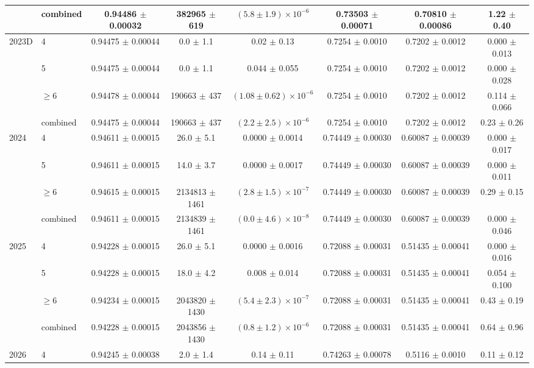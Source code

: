 \begin{table}
\begin{tiny}
\begin{tabular}{llcccccc}
 & combined & 0.94486 $\pm$ 0.00032 & 382965 $\pm$ 619 & $(5.8 \pm 1.9) \times 10^{-6}$ & 0.73503 $\pm$ 0.00071 & 0.70810 $\pm$ 0.00086 & 1.22 $\pm$ 0.40 \\
\hline
\multirow{4}{*}{2023D} & 4 & 0.94475 $\pm$ 0.00044 & 0.0 $\pm$ 1.1 & 0.02 $\pm$ 0.13 & 0.7254 $\pm$ 0.0010 & 0.7202 $\pm$ 0.0012 & 0.000 $\pm$ 0.013 \\
 & 5 & 0.94475 $\pm$ 0.00044 & 0.0 $\pm$ 1.1 & 0.044 $\pm$ 0.055 & 0.7254 $\pm$ 0.0010 & 0.7202 $\pm$ 0.0012 & 0.000 $\pm$ 0.028 \\
 & $\geq 6$ & 0.94478 $\pm$ 0.00044 & 190663 $\pm$ 437 & $(1.08 \pm 0.62) \times 10^{-6}$ & 0.7254 $\pm$ 0.0010 & 0.7202 $\pm$ 0.0012 & 0.114 $\pm$ 0.066 \\
 & combined & 0.94475 $\pm$ 0.00044 & 190663 $\pm$ 437 & $(2.2 \pm 2.5) \times 10^{-6}$ & 0.7254 $\pm$ 0.0010 & 0.7202 $\pm$ 0.0012 & 0.23 $\pm$ 0.26 \\
\hline
\multirow{4}{*}{2024} & 4 & 0.94611 $\pm$ 0.00015 & 26.0 $\pm$ 5.1 & 0.0000 $\pm$ 0.0014 & 0.74449 $\pm$ 0.00030 & 0.60087 $\pm$ 0.00039 & 0.000 $\pm$ 0.017 \\
 & 5 & 0.94611 $\pm$ 0.00015 & 14.0 $\pm$ 3.7 & 0.0000 $\pm$ 0.0017 & 0.74449 $\pm$ 0.00030 & 0.60087 $\pm$ 0.00039 & 0.000 $\pm$ 0.011 \\
 & $\geq 6$ & 0.94615 $\pm$ 0.00015 & 2134813 $\pm$ 1461 & $(2.8 \pm 1.5) \times 10^{-7}$ & 0.74449 $\pm$ 0.00030 & 0.60087 $\pm$ 0.00039 & 0.29 $\pm$ 0.15 \\
 & combined & 0.94611 $\pm$ 0.00015 & 2134839 $\pm$ 1461 & $(0.0 \pm 4.6) \times 10^{-8}$ & 0.74449 $\pm$ 0.00030 & 0.60087 $\pm$ 0.00039 & 0.000 $\pm$ 0.046 \\
\hline
\multirow{4}{*}{2025} & 4 & 0.94228 $\pm$ 0.00015 & 26.0 $\pm$ 5.1 & 0.0000 $\pm$ 0.0016 & 0.72088 $\pm$ 0.00031 & 0.51435 $\pm$ 0.00041 & 0.000 $\pm$ 0.016 \\
 & 5 & 0.94228 $\pm$ 0.00015 & 18.0 $\pm$ 4.2 & 0.008 $\pm$ 0.014 & 0.72088 $\pm$ 0.00031 & 0.51435 $\pm$ 0.00041 & 0.054 $\pm$ 0.100 \\
 & $\geq 6$ & 0.94234 $\pm$ 0.00015 & 2043820 $\pm$ 1430 & $(5.4 \pm 2.3) \times 10^{-7}$ & 0.72088 $\pm$ 0.00031 & 0.51435 $\pm$ 0.00041 & 0.43 $\pm$ 0.19 \\
 & combined & 0.94228 $\pm$ 0.00015 & 2043856 $\pm$ 1430 & $(0.8 \pm 1.2) \times 10^{-6}$ & 0.72088 $\pm$ 0.00031 & 0.51435 $\pm$ 0.00041 & 0.64 $\pm$ 0.96 \\
\hline
\multirow{4}{*}{2026} & 4 & 0.94245 $\pm$ 0.00038 & 2.0 $\pm$ 1.4 & 0.14 $\pm$ 0.11 & 0.74263 $\pm$ 0.00078 & 0.5116 $\pm$ 0.0010 & 0.11 $\pm$ 0.12 \\

\end{tabular}
\end{tiny}
\end{table}
